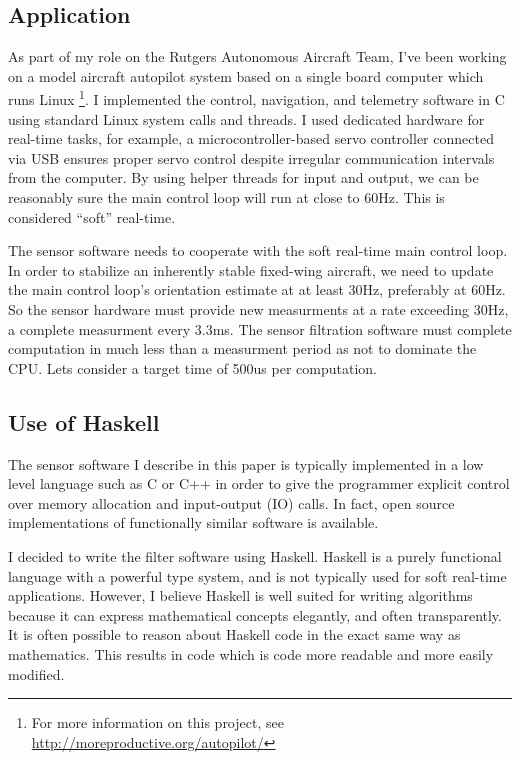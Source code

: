 \documentclass[12pt]{report}
\begin{document}
\subsection{Application}

As part of my role on the Rutgers Autonomous Aircraft Team, I've been working on a model aircraft autopilot system based on a single board computer which runs Linux \footnote{For more information on this project, see \url{http://moreproductive.org/autopilot/}}. I implemented the control, navigation, and telemetry software in C using standard Linux system calls and threads. I used dedicated hardware for real-time tasks, for example, a microcontroller-based servo controller connected via USB ensures proper servo control despite irregular communication intervals from the computer. 
By using helper threads for input and output, we can be reasonably sure the main control loop will run at close to 60Hz. This is considered ``soft'' real-time.

The sensor software needs to cooperate with the soft real-time main control loop. In order to stabilize an inherently stable fixed-wing aircraft, we need to update the main control loop's orientation estimate at at least 30Hz, preferably at 60Hz. So the sensor hardware must provide new measurments at a rate exceeding 30Hz, a complete measurment every 3.3ms. The sensor filtration software must complete computation in much less than a measurment period as not to dominate the CPU. Lets consider a target time of 500us per computation.

\subsection{Use of Haskell}

The sensor software I describe in this paper is typically implemented in a low level language such as C or C++ in order to give the programmer explicit control over memory allocation and input-output (IO) calls. In fact, open source implementations of functionally similar software is available. 

I decided to write the filter software using Haskell. Haskell is a purely functional language with a powerful type system, and is not typically used for soft real-time applications. However, I believe Haskell is well suited for writing algorithms because it can express mathematical concepts elegantly, and often transparently. It is often possible to reason about Haskell code in the exact same way as mathematics. This results in code which is code more readable and more easily modified. 
\end{document}
